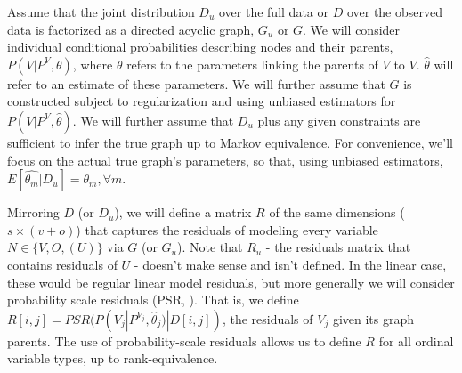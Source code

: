 \documentclass{article}
\begin{document}
\begin{table}[h]
\centering
{}
\caption{Notation}
\label{tab:notation}
\end{table}

Assume that the joint distribution $D_{u}$ over the full data or $D$ over the observed data is factorized as a directed acyclic graph, $G_{u}$ or $G$.  We will consider individual conditional probabilities describing nodes and their parents, $P(V | P^{V}, \theta)$, where $\theta$ refers to the parameters linking  the parents of $V$ to $V$.  $\hat{\theta}$ will refer to an estimate of these parameters.  We will further assume that $G$ is constructed subject to regularization and using unbiased estimators for $P(V | P^{V}, \hat{\theta})$.  We will further assume that $D_u$ plus any given constraints are sufficient to infer the true graph up to Markov equivalence.  For convenience, we'll focus on the actual true graph's parameters, so that, using unbiased estimators, $E[\hat{\theta_m}|D_u] = \theta_m, \forall m$.

Mirroring $D$ (or $D_u$), we will define a matrix $R$ of the same dimensions ($s \times (v + o)$) that captures the residuals of modeling every variable $N \in \{V, O, (U)\}$ via $G$ (or $G_u$).  Note that $R_u$ - the residuals matrix that contains residuals of $U$ - doesn't make sense and isn't defined.  In the linear case, these would be regular linear model residuals, but more generally we will consider probability scale residuals (PSR, \cite{shepherd_probability-scale_2016}).  That is, we define $R[i, j] = PSR(P(V_j | P^{V_j}, \hat{\theta}_j) | D[i, j])$, the residuals of $V_j$ given its graph parents.  The use of probability-scale residuals allows us to define $R$ for all ordinal variable types, up to rank-equivalence.
\end{document}
